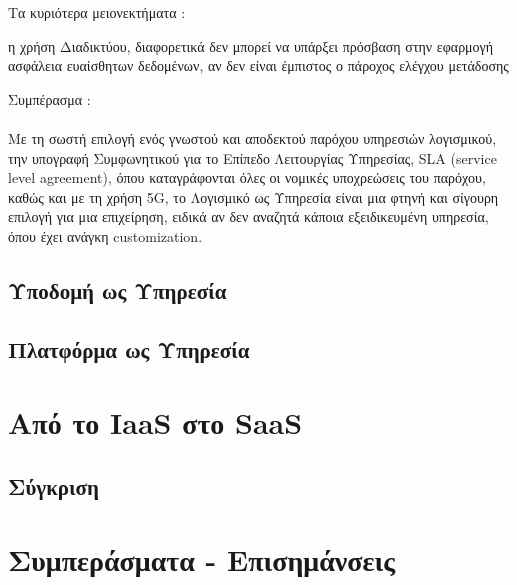 \documentclass{article}
\begin{document}
\newpage
Τα κυριότερα μειονεκτήματα :
\begin{itemize}
  η χρήση Διαδικτύου, διαφορετικά δεν μπορεί να υπάρξει πρόσβαση στην εφαρμογή
 ασφάλεια ευαίσθητων δεδομένων, αν δεν είναι έμπιστος ο πάροχος
 ελέγχου
 μετάδοσης
\end{itemize}
Συμπέρασμα : \\ \\
Με τη σωστή επιλογή ενός γνωστού και αποδεκτού παρόχου υπηρεσιών λογισμικού, την υπογραφή Συμφωνητικού για το Επίπεδο Λειτουργίας Υπηρεσίας, SLA (service level agreement), όπου καταγράφονται όλες οι νομικές υποχρεώσεις του παρόχου, καθώς και με τη χρήση  5G, το Λογισμικό ως Υπηρεσία είναι μια φτηνή και σίγουρη επιλογή για μια επιχείρηση, ειδικά αν δεν αναζητά κάποια εξειδικευμένη υπηρεσία, όπου έχει ανάγκη  customization.
\subsection{Υποδομή ως Υπηρεσία}

\newpage
\subsection{Πλατφόρμα ως Υπηρεσία}

\section{Από το IaaS στο SaaS}

\subsection{Σύγκριση}
\section{Συμπεράσματα - Επισημάνσεις}
\end{document}

